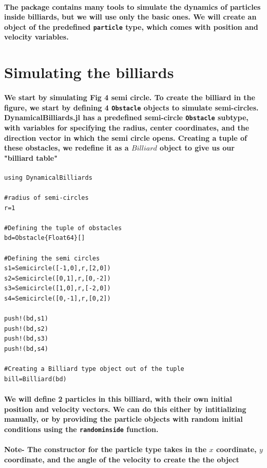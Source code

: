 \documentclass{report}
\begin{document}
\paragraph{The package contains many tools to simulate the dynamics of particles inside billiards, but we will use only the basic ones. We will create an object of the predefined \verb|particle| type, which comes with position and velocity variables.}


\section{Simulating the billiards}

\paragraph{We start by simulating Fig 4 semi circle. To create the billiard in the figure, we start by defining 4 \verb|Obstacle| objects to simulate semi-circles. DynamicalBilliards.jl has a predefined semi-circle \verb|Obstacle| subtype, with variables for specifying the radius, center coordinates, and the direction vector in which the semi circle opens. Creating a tuple of these obstacles, we redefine it as a $Billiard$ object to give us our "billiard table"  }

\begin{lstlisting}
using DynamicalBilliards

#radius of semi-circles
r=1 

#Defining the tuple of obstacles
bd=Obstacle{Float64}[]

#Defining the semi circles
s1=Semicircle([-1,0],r,[2,0])
s2=Semicircle([0,1],r,[0,-2])
s3=Semicircle([1,0],r,[-2,0])
s4=Semicircle([0,-1],r,[0,2])

push!(bd,s1)
push!(bd,s2)
push!(bd,s3)
push!(bd,s4)

#Creating a Billiard type object out of the tuple
bill=Billiard(bd)
\end{lstlisting}

\paragraph{We will define 2 particles in this billiard, with their own initial position and velocity vectors. We can do this either by intitializing manually, or by providing the particle objects with random initial conditions using the \verb|randominside| function.}

\paragraph{Note- The constructor for the particle type takes in the $x$ coordinate, $y$ coordinate, and the angle of the velocity to create the the object}
\end{document}
